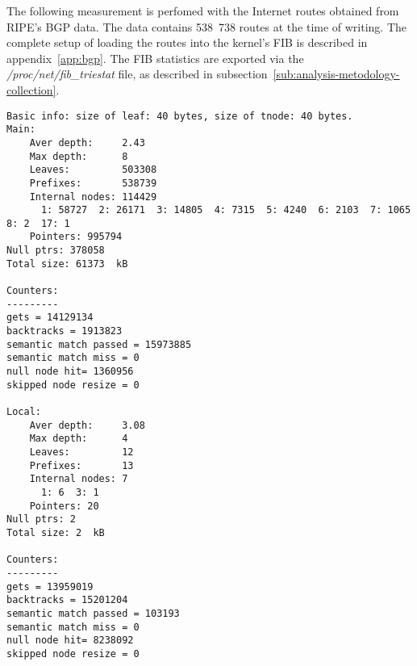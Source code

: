 
The following measurement is perfomed with the Internet routes obtained from RIPE's BGP data.
The data contains 538~738 routes at the time of writing.
The complete setup of loading the routes into the kernel's FIB is described in appendix~\ref{app:bgp}.
The FIB statistics are exported via the {\it{/proc/net/fib\_triestat}} file, as described in
subsection~\ref{sub:analysis-metodology-collection}.
\begin{lstlisting}
Basic info: size of leaf: 40 bytes, size of tnode: 40 bytes.
Main:
	Aver depth:     2.43
	Max depth:      8
	Leaves:         503308
	Prefixes:       538739
	Internal nodes: 114429
	  1: 58727  2: 26171  3: 14805  4: 7315  5: 4240  6: 2103  7: 1065  8: 2  17: 1
	Pointers: 995794
Null ptrs: 378058
Total size: 61373  kB

Counters:
---------
gets = 14129134
backtracks = 1913823
semantic match passed = 15973885
semantic match miss = 0
null node hit= 1360956
skipped node resize = 0

Local:
	Aver depth:     3.08
	Max depth:      4
	Leaves:         12
	Prefixes:       13
	Internal nodes: 7
	  1: 6  3: 1
	Pointers: 20
Null ptrs: 2
Total size: 2  kB

Counters:
---------
gets = 13959019
backtracks = 15201204
semantic match passed = 103193
semantic match miss = 0
null node hit= 8238092
skipped node resize = 0
\end{lstlisting}
